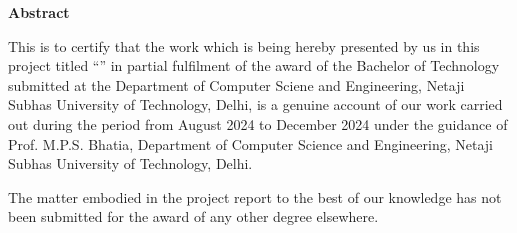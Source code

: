 \thispagestyle{plain}
\begin{center}
\large \large \textbf{Abstract}
\end{center}

\vspace{0.3cm}
\fontsize{12pt}{24pt}\selectfont This is to certify that the work which is being hereby presented by us in this project titled “\textbf{\btptitle}” in partial fulfilment of the award of the Bachelor of Technology submitted at the Department of Computer Sciene and Engineering, Netaji Subhas University of Technology, Delhi, is a genuine account of our work carried out during the period from August 2024 to December 2024 under the guidance of Prof. M\@.P\@.S\@. Bhatia, Department of Computer Science and Engineering, Netaji Subhas University of Technology, Delhi.

The matter embodied in the project report to the best of our knowledge has not been submitted for the award of any other degree elsewhere.
\vspace{2.0cm}


\newpage